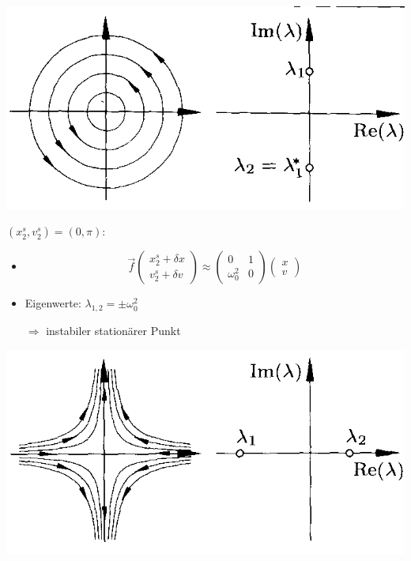 \documentclass[12pt,compress]{beamer}
\begin{document}
{{        \vfill
        \pause

        {
        \begin{center}
        \includegraphics[scale=0.25]{05_center_point.png}
        \end{center}
        }
    }

    {
        $(x^s_2, v^s_2) = (0, \pi)$:
        \begin{itemize}
        \item 
        \begin{equation}
        \nonumber
        \vec{f}\left(\begin{array}{c} x^s_2+\delta x \\ v^s_2 + \delta v\end{array}\right) \approx \left(\begin{array}{cc} 0 & 1 \\ \omega_0^2 & 0 \end{array}\right) \left(\begin{array}{c} x \\ v \end{array}\right)
        \end{equation}
        \item Eigenwerte: $\lambda_{1,2} = \pm\omega_0^2$
        \item[$\Rightarrow$] instabiler stationärer Punkt
        \end{itemize}

        \vfill

        {
        \begin{center}
        \includegraphics[scale=0.3]{06_saddle_point.png}
        \end{center}
        }
    }
}
\end{document}
